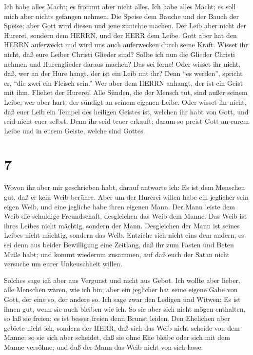  Ich habe alles Macht; es frommt aber nicht alles. Ich habe
alles Macht; es soll mich aber nichts gefangen nehmen.  Die
Speise dem Bauche und der Bauch der Speise; aber Gott wird diesen und
jene zunichte machen. Der Leib aber nicht der Hurerei, sondern dem
HERRN, und der HERR dem Leibe.  Gott aber hat den HERRN
auferweckt und wird uns auch auferwecken durch seine Kraft.
 Wisset ihr nicht, daß eure Leiber Christi Glieder sind?
Sollte ich nun die Glieder Christi nehmen und Hurenglieder daraus
machen? Das sei ferne!  Oder wisset ihr nicht, daß, wer an
der Hure hangt, der ist ein Leib mit ihr? Denn ``es werden'', spricht
er, ``die zwei ein Fleisch sein.''  Wer aber dem HERRN
anhangt, der ist ein Geist mit ihm.  Fliehet der Hurerei!
Alle Sünden, die der Mensch tut, sind außer seinem Leibe; wer aber hurt,
der sündigt an seinem eigenen Leibe.  Oder wisset ihr
nicht, daß euer Leib ein Tempel des heiligen Geistes ist, welchen ihr
habt von Gott, und seid nicht euer selbst.  Denn ihr seid
teuer erkauft; darum so preist Gott an eurem Leibe und in eurem Geiste,
welche sind Gottes.

\hypertarget{section-6}{%
\section{7}\label{section-6}}

 Wovon ihr aber mir geschrieben habt, darauf antworte ich:
Es ist dem Menschen gut, daß er kein Weib berühre.  Aber um
der Hurerei willen habe ein jeglicher sein eigen Weib, und eine jegliche
habe ihren eigenen Mann.  Der Mann leiste dem Weib die
schuldige Freundschaft, desgleichen das Weib dem Manne.  Das
Weib ist ihres Leibes nicht mächtig, sondern der Mann. Desgleichen der
Mann ist seines Leibes nicht mächtig, sondern das Weib. 
Entziehe sich nicht eins dem andern, es sei denn aus beider Bewilligung
eine Zeitlang, daß ihr zum Fasten und Beten Muße habt; und kommt
wiederum zusammen, auf daß euch der Satan nicht versuche um eurer
Unkeuschheit willen.

 Solches sage ich aber aus Vergunst und nicht aus Gebot.
 Ich wollte aber lieber, alle Menschen wären, wie ich bin;
aber ein jeglicher hat seine eigene Gabe von Gott, der eine so, der
andere so.  Ich sage zwar den Ledigen und Witwen: Es ist
ihnen gut, wenn sie auch bleiben wie ich.  So sie aber sich
nicht mögen enthalten, so laß sie freien; es ist besser freien denn
Brunst leiden.  Den Ehelichen aber gebiete nicht ich,
sondern der HERR, daß sich das Weib nicht scheide von dem Manne;
 so sie sich aber scheidet, daß sie ohne Ehe bleibe oder
sich mit dem Manne versöhne; und daß der Mann das Weib nicht von sich
lasse.

